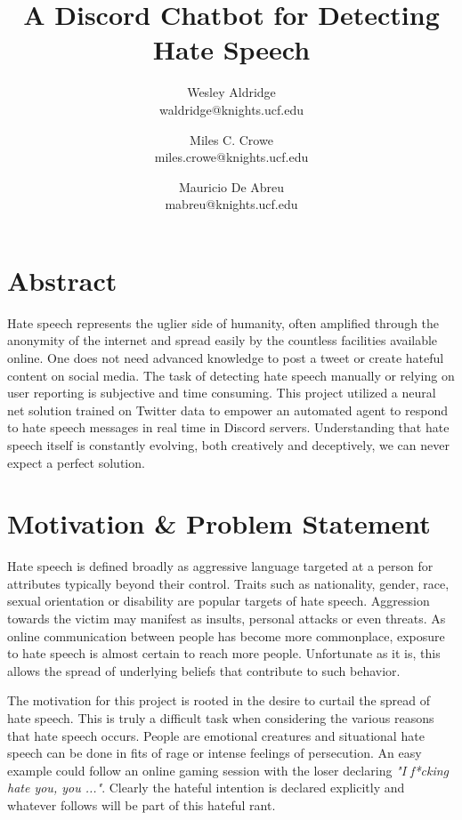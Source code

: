 \documentclass[conference]{sig-alternate-05-2015}
\begin{document}
\title{A Discord Chatbot for Detecting Hate Speech}

\author{Wesley Aldridge\\ waldridge@knights.ucf.edu \and Miles C. Crowe  \\ miles.crowe@knights.ucf.edu \and Mauricio De Abreu\\ mabreu@knights.ucf.edu}

\maketitle

\section{Abstract}
Hate speech represents the uglier side of humanity, often amplified through the anonymity of the internet and spread easily by the countless facilities available online. One does not need advanced knowledge to post a tweet or create hateful content on social media. The task of detecting hate speech manually or relying on user reporting is subjective and time consuming. This project utilized a neural net solution trained on Twitter data to empower an automated agent to respond to hate speech messages in real time in Discord servers. Understanding that hate speech itself is constantly evolving, both creatively and deceptively, we can never expect a perfect solution.


\section{Motivation \& Problem Statement}\label{sec:motivation}
Hate speech is defined broadly as aggressive language targeted at a person for attributes typically beyond their control.  Traits such as nationality, gender, race, sexual orientation or disability are popular targets of hate speech\cite{Dictionary.com}.  Aggression towards the victim may manifest as insults, personal attacks or even threats.  As online communication between people has become more commonplace, exposure to hate speech is almost certain to reach more people.  Unfortunate as it is, this allows the spread of underlying beliefs that contribute to such behavior.

The motivation for this project is rooted in the desire to curtail the spread of hate speech.  This is truly a difficult task when considering the various reasons that hate speech occurs.  People are emotional creatures and situational hate speech can be done in fits of rage or intense feelings of persecution.  An easy example could follow an online gaming session with the loser declaring \textit{"I f*cking hate you, you ..."}.  Clearly the hateful intention is declared explicitly and whatever follows will be part of this hateful rant.  
\end{document}
